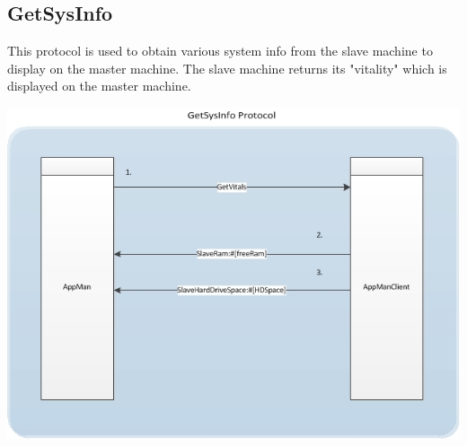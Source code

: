 \documentclass[a4paper,12pt,final]{article}
\begin{document}
\subsection{GetSysInfo}
This protocol is used to obtain various system info from the slave machine to display on the master machine. The slave machine returns its "vitality" which is displayed on the master machine.
\begin{center}
\includegraphics[scale=0.85]{CommunicationProtocol/GetSysInfoProtocol.jpg} 
\end{center}



\end{document}
